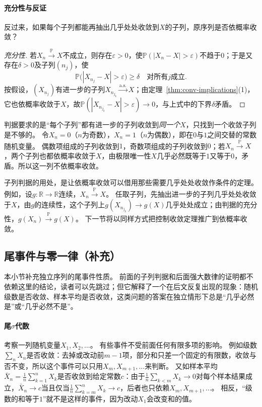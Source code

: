 \paragraph{充分性与反证}
反过来，如果每个子列都能再抽出几乎处处收敛到$X$的子列，原序列是否依概率收敛？

\begin{proof}[充分性]
若$X_n\xrightarrow{\mathbb P}X$不成立，则存在$\varepsilon>0$，使$\mathbb P(|X_n-X|>\varepsilon)$不趋于$0$；于是又存在$\delta>0$及子列$(n_j)$，使
\[
  \mathbb P\bigl(|X_{n_j}-X|>\varepsilon\bigr)\geq\delta\quad\text{对所有}j\text{成立}.
\]
按假设，$(X_{n_j})$有进一步的子列$X_{n_{j_k}}\xrightarrow{\mathrm{a.s.}}X$；由定理~\ref{thm:conv-implications}(1)，它也依概率收敛于$X$，故$\mathbb P(|X_{n_{j_k}}-X|>\varepsilon)\to0$，与上式中的下界$\delta$矛盾。
\end{proof}

判据要求的是“每个子列”都有进一步的子列收敛到\emph{同一个}$X$，只找到一个收敛子列是不够的。
令$X_n=0$（$n$为奇数），$X_n=1$（$n$为偶数），即在$0$与$1$之间交替的常数随机变量。
偶数项组成的子列收敛到$1$，奇数项组成的子列收敛到$0$；若$X_n\xrightarrow{\mathbb P}X$，两个子列也都依概率收敛于$X$，由极限唯一性$X$几乎必然既等于$1$又等于$0$，矛盾。所以这一列不依概率收敛。

子列判据的用处，是让依概率收敛可以借用那些需要几乎处处收敛作条件的定理。
例如，设$g:\mathbb R\to\mathbb R$连续，$X_n\xrightarrow{\mathbb P}X$。
任取子列，先抽出进一步的子列几乎处处收敛于$X$，由$g$的连续性，这个子列上$g(X_{n_{j_k}})\to g(X)$几乎处处成立；由判据的充分性，$g(X_n)\xrightarrow{\mathbb P}g(X)$。
下一节将以同样方式把控制收敛定理推广到依概率收敛。

\subsection{尾事件与零一律（补充）}

本小节补充独立序列的尾事件性质。
前面的子列判据和后面强大数律的证明都不依赖这里的结论，读者可以先跳过；但它解释了一个在后文反复出现的现象：随机级数是否收敛、样本平均是否收敛，这类问题的答案在独立情形下总是“几乎必然是”或“几乎必然不是”。

\paragraph{尾$\sigma$代数}
考察一列随机变量$X_1,X_2,\ldots$。
有些事件不受前面任何有限多项的影响。
例如级数$\sum_nX_n$是否收敛：去掉或改动前$m-1$项，部分和只差一个固定的有限数，收敛与否不变，所以这个事件可以只用$X_m,X_{m+1},\ldots$来判断。
又如样本平均$\bar X_n=\frac1n\sum_{k=1}^nX_k$是否收敛到给定常数$c$：由于$\frac1n\sum_{k<m}X_k\to0$对每个样本结果成立，$\bar X_n\to c$当且仅当$\frac1n\sum_{k=m}^nX_k\to c$，后者也只依赖$X_m,X_{m+1},\ldots$。
相反，“级数的和等于$1$”就不是这样的事件，因为改动$X_1$会改变和的值。

